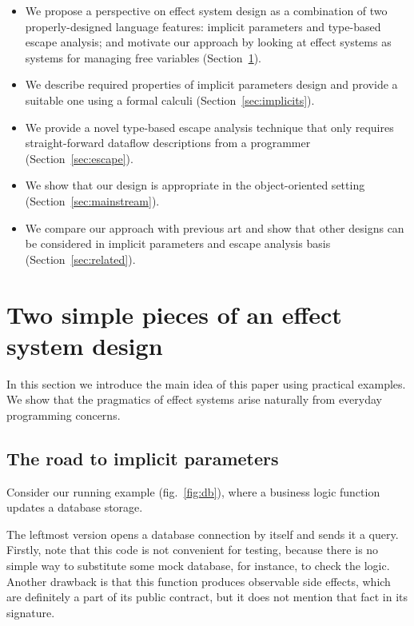 \documentclass[acmsmall]{acmart}
\begin{document}
\begin{itemize}
    \item We propose a perspective on effect system design as a combination of two properly-designed language features: implicit parameters and type-based escape analysis; and motivate our approach by looking at effect systems as systems for managing free variables (Section~\ref{sec:idea}).
    \item We describe required properties of implicit parameters design and provide a suitable one using a formal calculi (Section~\ref{sec:implicits}).
    \item We provide a novel type-based escape analysis technique that only requires straight-forward dataflow descriptions from a programmer (Section~\ref{sec:escape}).
    \item We show that our design is appropriate in the object-oriented setting (Section~\ref{sec:mainstream}).
    \item We compare our approach with previous art and show that other designs can be considered in implicit parameters and escape analysis basis (Section~\ref{sec:related}).
\end{itemize}


\section{Two simple pieces of an effect system design} \label{sec:idea}

In this section we introduce the main idea of this paper using practical examples.
We show that the pragmatics of effect systems arise naturally from everyday programming concerns.

\subsection{The road to implicit parameters} \label{subsec:implicits}

Consider our running example (fig.\ \ref{fig:db}), where a business logic function updates a database storage.

The leftmost version opens a database connection by itself and sends it a query.
Firstly, note that this code is not convenient for testing, because there is no simple way to substitute some mock database, for instance, to check the logic.
Another drawback is that this function produces observable side effects, which are definitely a part of its public contract, but it does not mention that fact in its signature.
\end{document}

